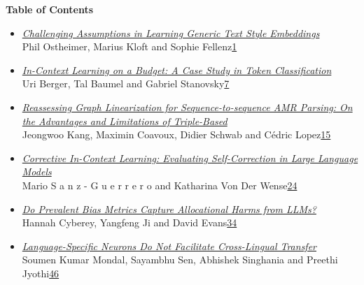 \documentclass[11pt,oneside]{book}
\begin{document}
{}
\newpage  %
\pagestyle{plain}
\begin{center}
{\Large \textbf{Table of Contents}}
\end{center}
\vspace*{1em}
\newcommand\page[1]{\rightskip=25pt \dotfill\rlap{\hbox to 25pt{\hfill#1}}\par}
\begin{itemize}[leftmargin=*,label={}]
       \item \hyperlink{page.1}{\emph{Challenging Assumptions in Learning Generic Text Style Embeddings}}\\ \hspace*{2em} Phil Ostheimer, Marius Kloft and Sophie Fellenz\dotfill \hyperlink{page.1}{1}
       \item \hyperlink{page.7}{\emph{In-Context Learning on a Budget: A Case Study in Token Classification}}\\ \hspace*{2em} Uri Berger, Tal Baumel and Gabriel Stanovsky\dotfill \hyperlink{page.7}{7}
       \item \hyperlink{page.15}{\emph{Reassessing Graph Linearization for Sequence-to-sequence AMR Parsing: On the Advantages and Limitations of Triple-Based}}\\ \hspace*{2em} Jeongwoo Kang, Maximin Coavoux, Didier Schwab and Cédric Lopez\dotfill \hyperlink{page.15}{15}
       \item \hyperlink{page.24}{\emph{Corrective In-Context Learning: Evaluating Self-Correction in Large Language Models}}\\ \hspace*{2em} Mario S a n z - G u e r r e r o and Katharina Von Der Wense\dotfill \hyperlink{page.24}{24}
       \item \hyperlink{page.34}{\emph{Do Prevalent Bias Metrics Capture Allocational Harms from LLMs?}}\\ \hspace*{2em} Hannah Cyberey, Yangfeng Ji and David Evans\dotfill \hyperlink{page.34}{34}
       \item \hyperlink{page.46}{\emph{Language-Specific Neurons Do Not Facilitate Cross-Lingual Transfer}}\\ \hspace*{2em} Soumen Kumar Mondal, Sayambhu Sen, Abhishek Singhania and Preethi Jyothi\dotfill \hyperlink{page.46}{46}

\end{itemize}
\end{document}
